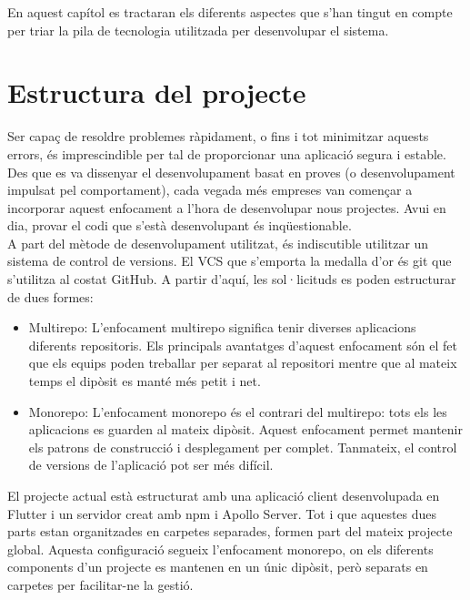 \documentclass[a4paper,12pt,twoside]{ThesisStyle}
\begin{document}
En aquest capítol es tractaran els diferents aspectes que s'han tingut en compte
per triar la pila de tecnologia utilitzada per desenvolupar el sistema.


\section{Estructura del projecte}
\label{sec:Estructura del projecte}

Ser capaç de resoldre problemes ràpidament, o fins i tot minimitzar aquests errors, és imprescindible
per tal de proporcionar una aplicació segura i estable. Des que es va dissenyar el desenvolupament basat en proves (o desenvolupament impulsat pel comportament), cada vegada més empreses van començar a incorporar aquest enfocament a l'hora de desenvolupar nous projectes. Avui en dia, provar el codi que s'està desenvolupant és inqüestionable.\\

A part del mètode de desenvolupament utilitzat, és indiscutible utilitzar un sistema de control de versions. El VCS que s'emporta la medalla d'or és git que s'utilitza al costat
GitHub. A partir d'aquí, les sol·licituds es poden estructurar de dues formes:

\begin{itemize}
    \item Multirepo: L'enfocament multirepo significa tenir diverses aplicacions
    diferents repositoris. Els principals avantatges d'aquest enfocament són el fet que
    els equips poden treballar per separat al repositori mentre que al mateix temps
    el dipòsit es manté més petit i net.
    \item Monorepo: L'enfocament monorepo és el contrari del multirepo: tots els
    les aplicacions es guarden al mateix dipòsit. Aquest enfocament permet mantenir els patrons de construcció i desplegament per complet. Tanmateix, el control de versions de l'aplicació pot ser més difícil.
    
\end{itemize}


El projecte actual està estructurat amb una aplicació client desenvolupada en Flutter i un servidor creat amb npm i Apollo Server. Tot i que aquestes dues parts estan organitzades en carpetes separades, formen part del mateix projecte global. Aquesta configuració segueix l'enfocament monorepo, on els diferents components d'un projecte es mantenen en un únic dipòsit, però separats en carpetes per facilitar-ne la gestió.\\
\end{document}
